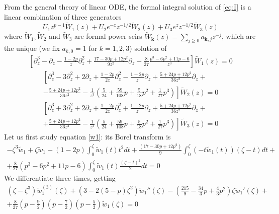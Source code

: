 \documentclass{article}
\theoremstyle{definition}
\begin{document}
From the general theory of linear ODE, the formal integral solution of \eqref{eq:I} is a linear combination of three generators 
\begin{equation}
U_1z^{p-1}\tilde{W}_1(z)+U_2e^{-z}z^{-1/2}\tilde{W}_2(z)+U_3e^{z}z^{-1/2}\tilde{W}_3(z)
\end{equation}
where $\tilde{W}_1, \tilde{W}_2$ and $\tilde{W}_3$ are formal power seirs $\tilde{W}_{\mathbf{k}}(z)=\sum_{j\geq 0}a_{\mathbf{k},j}z^{-j}$, which are the unique (we fix $a_{k,0}=1$ for $k=1,2,3$) solution of 
\begin{multline}\label{w1}
\left[\partial_z^3-\partial_z-\frac{1-2p}{z}\partial_z^2+\frac{17-30p+12p^2}{9z^2}\partial_z+\frac{8}{27}\frac{p^3-6 p^2+ 11p- 6}{z^3}\right]\tilde{W}_1(z)=0
\end{multline}
\begin{multline}\label{w2}
\left[\partial_z^3-3\partial_z^2+2\partial_z+\frac{1-2p}{2z}\partial_z^2-\frac{1-2p}{z}\partial_z+\frac{5+24p+12p^2}{36z^2}\partial_z+\right.\\
\left.-\frac{5+24p+12p^2}{36z^2}-\frac{1}{z^3}\left(\frac{5}{24}+\frac{59}{108}p+\frac{5}{18}p^2+\frac{1}{27}p^3\right)\right]\tilde{W}_2(z)=0
\end{multline}
\begin{multline}\label{w3}
\left[\partial_z^3+3\partial_z^2+2\partial_z+\frac{1-2p}{2z}\partial_z^2+\frac{1-2p}{z}\partial_z+\frac{5+24p+12p^2}{36z^2}\partial_z+\right.\\
\left.+\frac{5+24p+12p^2}{36z^2}-\frac{1}{z^3}\left(\frac{5}{24}+\frac{59}{108}p+\frac{5}{18}p^2+\frac{1}{27}p^3\right)\right]\tilde{W}_3(z)=0
\end{multline}
Let us first study equation \eqref{w1}: its Borel transform is
\begin{multline*}
-\zeta^3\tilde{w}_1+\zeta\tilde{w}_1-(1-2p)\int_0^\zeta\tilde{w}_1(t)t^2dt+\frac{(17-30p+12p^2)}{9}\int_0^\zeta(-t\tilde{w}_1(t))(\zeta-t)dt+\\
+\frac{8}{27}(p^3-6p^2+11p-6)\int_0^\zeta\tilde{w}_1(t)\frac{(\zeta-t)^2}{2}dt=0
\end{multline*}
We differentiate three times, getting 
\begin{multline*}
\left(\zeta-\zeta^3\right)\tilde{w}_1^{(3)}(\zeta)+\left(3-2(5-p)\zeta^2\right)\tilde{w}_1''(\zeta)-\left(\frac{215}{9}-\frac{34}{3}p+\frac{4}{3}p^2\right)\zeta\tilde{w}_1'(\zeta)+\\
+\frac{8}{27}\left(p-\frac{9}{2}\right)\left(p-\frac{7}{2}\right)\left(p-\frac{5}{2}\right)\tilde{w}_1(\zeta)=0
\end{multline*}
\end{document}
